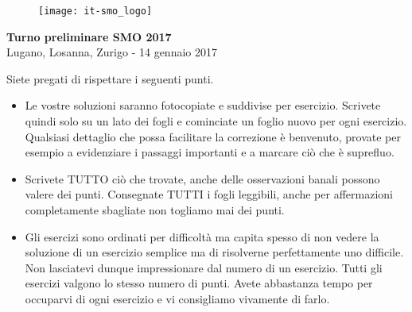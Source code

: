 \documentclass[12pt,a4paper]{article}
\begin{document}
\thispagestyle{empty}
\begin{figure}[h]
\texttt{[image: it-smo\_logo]}
\end{figure}

\vspace{1cm}

\begin{center}
\Huge{\textbf{Turno preliminare SMO 2017}}\\[1.5cm]
\large{Lugano, Losanna, Zurigo - 14 gennaio 2017}\\[3.5cm]
\end{center}


Siete pregati di rispettare i seguenti punti.

\begin{itemize}
\item Le vostre soluzioni saranno fotocopiate e suddivise per esercizio. Scrivete quindi solo su un lato dei fogli e cominciate un foglio nuovo per ogni esercizio. Qualsiasi dettaglio che possa facilitare la correzione è benvenuto, provate per esempio a evidenziare i passaggi importanti e a marcare ciò che è suprefluo.


\item Scrivete TUTTO ciò che trovate, anche delle osservazioni banali possono valere dei punti. Consegnate TUTTI i fogli leggibili, anche per affermazioni completamente sba\-glia\-te non togliamo mai dei punti.

\item Gli esercizi sono ordinati per difficoltà ma capita spesso di non vedere la soluzione di un esercizio semplice ma di risolverne perfettamente uno difficile. Non lasciatevi dunque impressionare dal numero di un esercizio. Tutti gli esercizi valgono lo stesso numero di punti. Avete abbastanza tempo per occuparvi di ogni esercizio e vi consigliamo vivamente di farlo.



\end{itemize}
\end{document}
